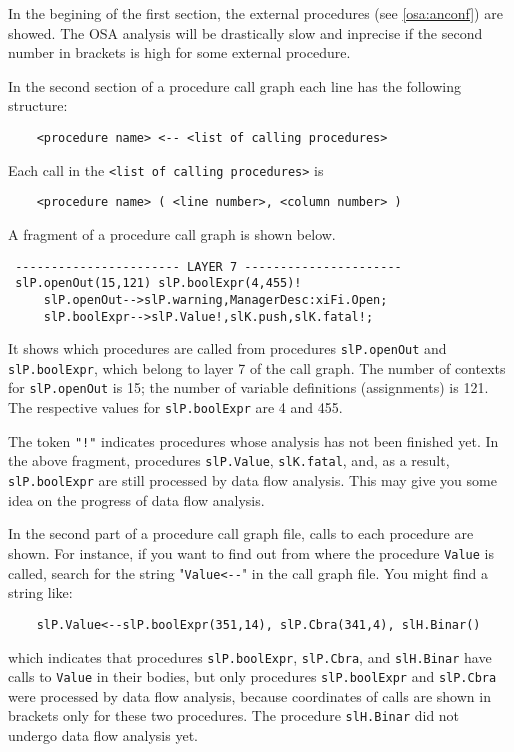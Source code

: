 In the begining of the first section, the external procedures 
(see \ref{osa:anconf}) are showed. The OSA analysis will be drastically
slow and inprecise if the second number in brackets is high for some
external procedure.

In the second section of a procedure call graph each line 
has the following structure:
 
\verb'    <procedure name> <-- <list of calling procedures>'

Each call in the \verb'<list of calling procedures>' is 

\verb'    <procedure name> ( <line number>, <column number> )'

A fragment of a procedure call graph is shown below.

\begin{verbatim}
 ----------------------- LAYER 7 ----------------------
 slP.openOut(15,121) slP.boolExpr(4,455)! 
     slP.openOut-->slP.warning,ManagerDesc:xiFi.Open;  
     slP.boolExpr-->slP.Value!,slK.push,slK.fatal!;  
\end{verbatim}

It shows which procedures are called from procedures \verb'slP.openOut' 
and \verb'slP.boolExpr', which belong to layer 7 of the call graph. 
The number of contexts for \verb'slP.openOut' is 15; the number of 
variable definitions (assignments) is 121. The respective values for 
\verb'slP.boolExpr' are 4 and 455.


The token \verb'"!"' indicates procedures whose analysis has not been 
finished yet. In the above fragment, procedures \verb'slP.Value', 
\verb'slK.fatal', and, as a result, \verb'slP.boolExpr' are still
processed by data flow analysis. This may give you some idea on
the progress of data flow analysis.

In the second part of a procedure call graph file, calls to 
each procedure are shown. For instance, if you want to find out
from where the procedure \verb'Value' is called, search for the string
"\verb'Value<--'" in the call graph file. 
You might find a string like:

\verb'    slP.Value<--slP.boolExpr(351,14), slP.Cbra(341,4), slH.Binar() ' 

which indicates that procedures \verb'slP.boolExpr', \verb'slP.Cbra',
and \verb'slH.Binar' have calls to \verb'Value' in their bodies,
but only procedures \verb'slP.boolExpr' and \verb'slP.Cbra' were processed 
by data flow analysis, because coordinates of calls are shown in brackets
only for these two procedures. The procedure \verb'slH.Binar' did not  
undergo data flow analysis yet.


